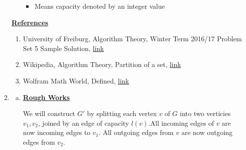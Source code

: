 \documentclass[12pt]{article}
\begin{document}
\begin{enumerate}[1.]
\begin{itemize}
        \begin{itemize}
            \item Means capacity denoted by an integer value
        \end{itemize}
    \end{itemize}

    \bigskip

    \underline{\textbf{References}}

    \bigskip

    \begin{enumerate}[1)]
        \item University of Freiburg, Algorithm Theory, Winter Term 2016/17 Problem Set 5 Sample Solution, \href{http://ac.informatik.uni-freiburg.de/teaching/ws16_17/algo1617/solutions/algo_exercise05_solution.pdf}{link}
        \item Wikipedia, Algorithm Theory, Partition of a set, \href{https://en.wikipedia.org/wiki/Partition_of_a_set#:~:text=In%20mathematics%2C%20a%20partition%20of,partition%20defines%20an%20equivalence%20relation.}{link}
        \item Wolfram Math World, Defined, \href{https://mathworld.wolfram.com/Defined.html}{link}
    \end{enumerate}

    \item

    \begin{enumerate}[a)]

        \item

        \bigskip

        \underline{\textbf{Rough Works}}
        \setcounter{equation}{0}
        \bigskip

        We will construct $G'$ by splitting each vertex $v$ of $G$ into two verticies
        $v_1, v_2$, joined by an edge of capacity $l(v)$.All incoming edges of $v$ are now
        incoming edges to $v_1$. All outgoing edges from $v$ are now outgoing edges from $v_2$.

        \bigskip


\end{enumerate}
\end{enumerate}
\end{document}

